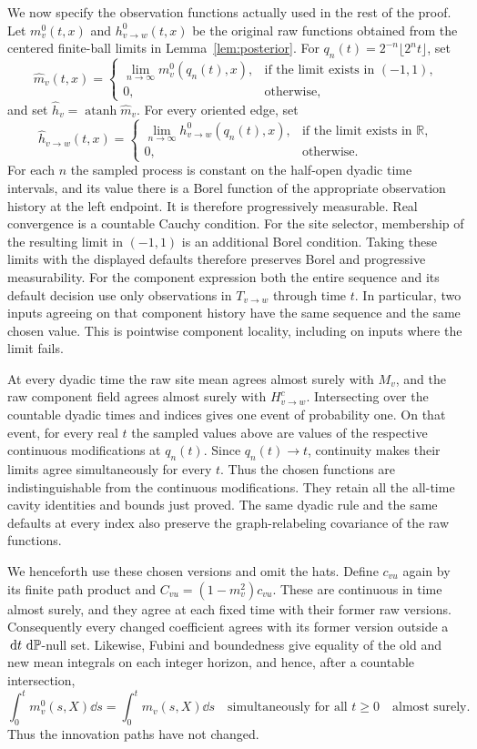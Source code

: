 We now specify the observation functions actually used in the rest of
the proof.  Let $m_v^0(t,x)$ and $h^0_{v\to w}(t,x)$ be the original
raw functions obtained from the centered finite-ball limits in
Lemma~\ref{lem:posterior}.  For
$q_n(t)=2^{-n}\lfloor2^nt\rfloor$, set
\[
 \widehat m_v(t,x)=
 \begin{cases}
  \displaystyle\lim_{n\to\infty}m_v^0(q_n(t),x),
       &\text{if the limit exists in }(-1,1),\\
  0,&\text{otherwise},
 \end{cases}
\]
and set $\widehat h_v=\operatorname{atanh}\widehat m_v$.  For every
oriented edge, set
\[
 \widehat h_{v\to w}(t,x)=
 \begin{cases}
  \displaystyle\lim_{n\to\infty}h^0_{v\to w}(q_n(t),x),
       &\text{if the limit exists in }\mathbb R,\\
  0,&\text{otherwise}.
 \end{cases}
\]
For each $n$ the sampled process is constant on the half-open dyadic
time intervals, and its value there is a Borel function of the
appropriate observation history at the left endpoint.  It is
therefore progressively measurable.  Real convergence is a countable
Cauchy condition.  For the site selector, membership of the resulting
limit in $(-1,1)$ is an additional Borel condition.  Taking these
limits with the displayed defaults therefore preserves Borel and
progressive measurability.
For the component expression both the entire sequence and its default
decision use only observations in $T_{v\to w}$ through time $t$.
In particular, two inputs agreeing on that component history have
the same sequence and the same chosen value.  This is pointwise
component locality, including on inputs where the limit fails.

At every dyadic time the raw site mean agrees almost surely with $M_v$,
and the raw component field agrees almost surely with $H^c_{v\to w}$.
Intersecting over the countable dyadic times and indices gives one
event of probability one.  On that event, for every real $t$ the
sampled values above are values of the respective continuous
modifications at $q_n(t)$.  Since $q_n(t)\to t$, continuity makes
their limits agree simultaneously for every $t$.  Thus the chosen
functions are indistinguishable from the continuous modifications.
They retain all the all-time cavity identities and bounds just
proved.  The same dyadic rule and the same defaults at every index
also preserve the graph-relabeling covariance of the raw functions.

We henceforth use these chosen versions and omit the hats.  Define
$c_{vu}$ again by its finite path product and
$C_{vu}=(1-m_v^2)c_{vu}$.  These are continuous in time almost surely,
and they agree at each fixed time with their former raw versions.
Consequently every changed coefficient agrees with its former version
outside a $\,\mathrm d t\,\,\mathrm d\mathbb P$-null set.  Likewise, Fubini and boundedness
give equality of the old and new mean integrals on each integer
horizon, and hence, after a countable intersection,
\[
 \int_0^t m_v^0(s,X)\dd s=\int_0^t m_v(s,X)\dd s
 \quad\text{simultaneously for all }t\ge0
 \quad\text{almost surely}.
\]
Thus the innovation paths have not changed.

